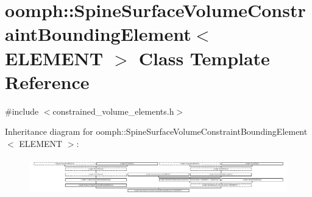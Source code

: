 \hypertarget{classoomph_1_1SpineSurfaceVolumeConstraintBoundingElement}{}\section{oomph\+:\+:Spine\+Surface\+Volume\+Constraint\+Bounding\+Element$<$ E\+L\+E\+M\+E\+NT $>$ Class Template Reference}
\label{classoomph_1_1SpineSurfaceVolumeConstraintBoundingElement}


{\ttfamily \#include $<$constrained\+\_\+volume\+\_\+elements.\+h$>$}

Inheritance diagram for oomph\+:\+:Spine\+Surface\+Volume\+Constraint\+Bounding\+Element$<$ E\+L\+E\+M\+E\+NT $>$\+:\begin{figure}[H]
\begin{center}
\leavevmode
\includegraphics[height=1.631068cm]{classoomph_1_1SpineSurfaceVolumeConstraintBoundingElement}
\end{center}
\end{figure}
